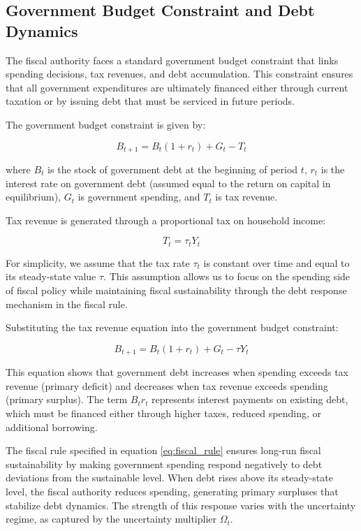 \documentclass[5p,authoryear]{elsarticle}
\begin{document}
\subsection{Government Budget Constraint and Debt Dynamics}

The fiscal authority faces a standard government budget constraint that links spending decisions, tax revenues, and debt accumulation. This constraint ensures that all government expenditures are ultimately financed either through current taxation or by issuing debt that must be serviced in future periods.

The government budget constraint is given by:

\begin{equation}
B_{t+1} = B_t (1 + r_t) + G_t - T_t
\label{eq:government_budget}
\end{equation}

where $B_t$ is the stock of government debt at the beginning of period $t$, $r_t$ is the interest rate on government debt (assumed equal to the return on capital in equilibrium), $G_t$ is government spending, and $T_t$ is tax revenue.

Tax revenue is generated through a proportional tax on household income:

\begin{equation}
T_t = \tau_t Y_t
\label{eq:tax_revenue}
\end{equation}

For simplicity, we assume that the tax rate $\tau_t$ is constant over time and equal to its steady-state value $\tau$. This assumption allows us to focus on the spending side of fiscal policy while maintaining fiscal sustainability through the debt response mechanism in the fiscal rule.

Substituting the tax revenue equation into the government budget constraint:

\begin{equation}
B_{t+1} = B_t (1 + r_t) + G_t - \tau Y_t
\label{eq:debt_dynamics}
\end{equation}

This equation shows that government debt increases when spending exceeds tax revenue (primary deficit) and decreases when tax revenue exceeds spending (primary surplus). The term $B_t r_t$ represents interest payments on existing debt, which must be financed either through higher taxes, reduced spending, or additional borrowing.

The fiscal rule specified in equation \eqref{eq:fiscal_rule} ensures long-run fiscal sustainability by making government spending respond negatively to debt deviations from the sustainable level. When debt rises above its steady-state level, the fiscal authority reduces spending, generating primary surpluses that stabilize debt dynamics. The strength of this response varies with the uncertainty regime, as captured by the uncertainty multiplier $\Omega_t$.
\end{document}
